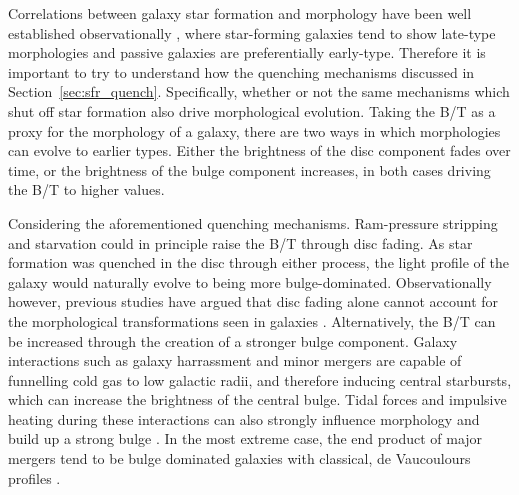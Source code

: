 Correlations between galaxy star formation and morphology have been
well established observationally \citep[e.g.][]{schawinski2014}, where
star-forming
galaxies tend to show late-type morphologies and passive galaxies are
preferentially early-type.  Therefore it is important to try to
understand how the quenching mechanisms discussed in
Section~\ref{sec:sfr_quench}.  Specifically, whether or not the same
mechanisms which shut off star formation also drive morphological
evolution.  Taking the B/T as a proxy for the morphology of a galaxy,
there are two ways in which morphologies can evolve to earlier types.
Either the brightness of the disc component fades over time, or the brightness
of the bulge component increases, in both cases driving the B/T to
higher values.
\par
Considering the aforementioned quenching mechanisms.  Ram-pressure
stripping and starvation could in principle raise the B/T through disc
fading.  As star formation was quenched in the disc through either
process, the light profile of the galaxy would naturally evolve to
being more bulge-dominated.  Observationally however, previous studies
have argued that disc fading alone cannot account for the
morphological transformations seen in galaxies \citep{christlein2004,
  bundy2010}.  Alternatively, the B/T can be increased through the
creation of a stronger bulge component.  Galaxy interactions such as galaxy
harrassment and minor mergers are capable of funnelling cold gas to
low galactic radii, and therefore inducing central starbursts, which
can increase the brightness of the
central bulge.  Tidal forces and impulsive heating during these interactions can also
strongly influence morphology and build up a strong bulge
\citep{moore1996, bekki2011}.  In the most extreme
case, the end product
of major mergers tend to be bulge dominated galaxies with classical,
de Vaucoulours profiles \citep[e.g.][]{barnes1989}.

%


